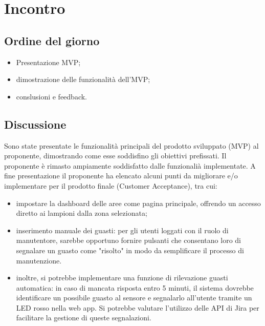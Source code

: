 \section{Incontro}

\subsection{Ordine del giorno}
\begin{itemize}
    \item Presentazione MVP;
    \item dimostrazione delle funzionalità dell'MVP;
    \item conslusioni e feedback.
\end{itemize}

\subsection{Discussione}
Sono state presentate le funzionalità principali del prodotto sviluppato (MVP) al proponente, dimostrando come esse soddisfino gli obiettivi prefissati. Il proponente è rimasto ampiamente soddisfatto dalle funzionalià implementate.
A fine presentazione il proponente ha elencato alcuni punti da migliorare e/o implementare per il prodotto finale (Customer Acceptance), tra cui:
\begin{itemize}
    \item impostare la dashboard delle aree come pagina principale, offrendo un accesso diretto ai lampioni dalla zona selezionata;
    \item inserimento manuale dei guasti: per gli utenti loggati con il ruolo di manutentore, sarebbe opportuno fornire pulsanti che consentano loro di segnalare un guasto come "risolto" in modo da semplificare il processo di manutenzione.
    \item inoltre, si potrebbe implementare una funzione di rilevazione guasti automatica: in caso di mancata risposta entro 5 minuti, il sistema dovrebbe identificare un possibile guasto al sensore e segnalarlo all'utente tramite un LED rosso nella web app. Si potrebbe valutare l'utilizzo delle API di Jira per facilitare la gestione di queste segnalazioni.
\end{itemize}